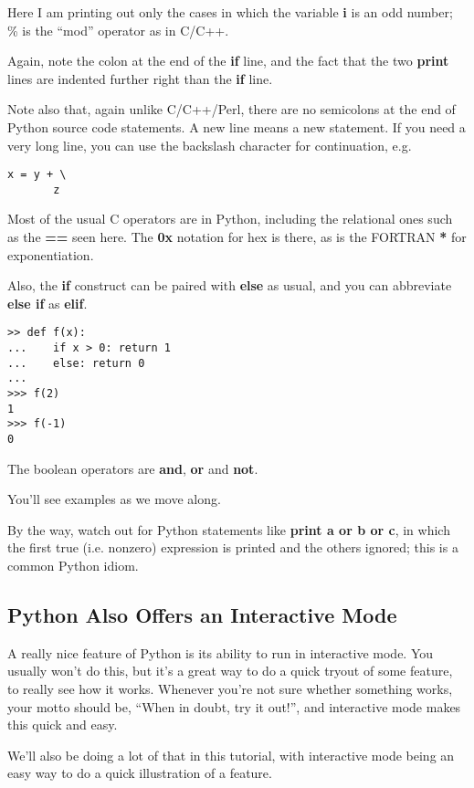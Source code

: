 Here I am printing out only the cases in which the variable {\bf i} is
an odd number; \% is the ``mod'' operator as in C/C++.

Again, note the colon at the end of the {\bf if} line, and the fact that
the two {\bf print} lines are indented further right than the {\bf if}
line. 

Note also that, again unlike C/C++/Perl, there are no semicolons at the
end of Python source code statements.  A new line means a new
statement.  If you need a very long line, you can use the
backslash character for continuation, e.g.

\begin{Verbatim}[fontsize=\relsize{-2}]
x = y + \
       z
\end{Verbatim}

Most of the usual C operators are in Python, including the relational
ones such as the {\bf ==} seen here.  The {\bf 0x} notation for hex is
there, as is the FORTRAN {\bf **} for exponentiation.  

Also, the {\bf if} construct can be paired with {\bf else} as usual, and
you can abbreviate {\bf else if} as {\bf elif}.  

\begin{Verbatim}[fontsize=\relsize{-2}]
>> def f(x):
...    if x > 0: return 1
...    else: return 0
...
>>> f(2)
1
>>> f(-1)
0
\end{Verbatim}

The boolean operators are {\bf and}, {\bf or} and {\bf not}.  

You'll see examples as we move along.  

By the way, watch out for Python statements like {\bf print a or b or
c}, in which the first true (i.e. nonzero) expression is printed and the
others ignored; this is a common Python idiom.

\subsection{Python Also Offers an Interactive Mode}
\label{interactive}

A really nice feature of Python is its ability to run in interactive
mode.  You usually won't do this, but it's a great way to do a quick
tryout of some feature, to really see how it works.  Whenever you're not
sure whether something works, your motto should be, ``When in doubt, try
it out!'', and interactive mode makes this quick and easy.

We'll also be doing a lot of that in this tutorial, with interactive
mode being an easy way to do a quick illustration of a feature. 

